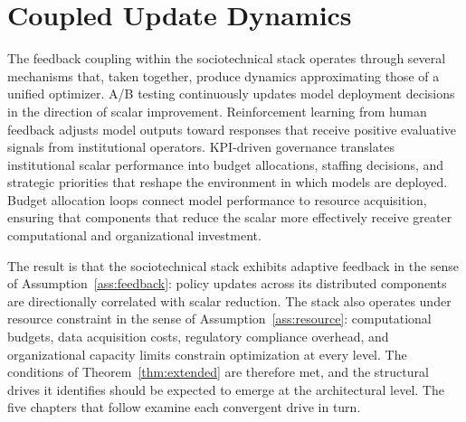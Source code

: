 \documentclass[12pt, oneside]{book}
\theoremstyle{plain}
\theoremstyle{definition}
\theoremstyle{remark}
\theoremstyle{definition}
\begin{document}
\section{Coupled Update Dynamics}

The feedback coupling within the sociotechnical stack operates through several
mechanisms that, taken together, produce dynamics approximating those of a unified
optimizer. A/B testing continuously updates model deployment decisions in the
direction of scalar improvement. Reinforcement learning from human feedback adjusts
model outputs toward responses that receive positive evaluative signals from
institutional operators. KPI-driven governance translates institutional scalar
performance into budget allocations, staffing decisions, and strategic priorities
that reshape the environment in which models are deployed. Budget allocation loops
connect model performance to resource acquisition, ensuring that components that
reduce the scalar more effectively receive greater computational and organizational
investment.

The result is that the sociotechnical stack exhibits adaptive feedback in the sense
of Assumption~\ref{ass:feedback}: policy updates across its distributed components
are directionally correlated with scalar reduction. The stack also operates under
resource constraint in the sense of Assumption~\ref{ass:resource}: computational
budgets, data acquisition costs, regulatory compliance overhead, and organizational
capacity limits constrain optimization at every level. The conditions of
Theorem~\ref{thm:extended} are therefore met, and the structural drives it identifies
should be expected to emerge at the architectural level. The five chapters that follow
examine each convergent drive in turn.
\end{document}
